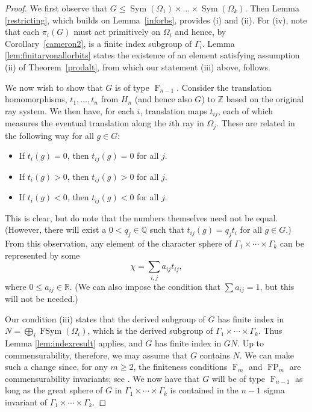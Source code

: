 \documentclass[11pt,a4paper]{amsart}
\theoremstyle{definition}
\theoremstyle{remark}
\newcommand{\Sym}{\operatorname{Sym}}
\newcommand{\FSym}{\operatorname{FSym}}
\newcommand{\Q}{\mathbb Q}
\newcommand{\Z}{\mathbb Z}
\newcommand{\R}{\mathbb R}
\newcommand{\FFF}{\operatorname{F}}
\newcommand{\FP}{\operatorname{FP}}
\begin{document}
\begin{proof}
	We first observe that $G\le \Sym(\Omega_1) \times \ldots\times \Sym(\Omega_k)$. Then Lemma \ref{restricting}, which builds on Lemma~\ref{inforbs}, provides (i) and  (ii).  For (iv), note that each $\pi_i(G)$ must act primitively on $\Omega_i$ and hence, by Corollary~\ref{cameron2}, is a finite index subgroup of $\Gamma_i$. Lemma \ref{lem:finitaryonallorbits} states the existence of an element satisfying assumption (ii) of Theorem~\ref{prodalt}, from which our statement (iii) above, follows.
	 	 
	We now wish to show that $G$ is of type $\FFF_{n-1}$. Consider the translation homomorphisms, $t_1, \ldots, t_n$ from $H_n$ (and hence also $G$) to $\Z$ based on the original ray system. We then have, for each $i$, translation maps $t_{ij}$, each of which measures the eventual translation along the $i$th ray in $\Omega_j$. These are related in the following way for all $g \in G$: 
	
	\begin{itemize}
		\item If $t_i(g)=0$, then $t_{ij}(g) = 0$ for all $j$. 
		\item If $t_i(g) >0$, then $t_{ij}(g) > 0$ for all $j$. 
		\item If $t_i(g) <0$, then $t_{ij}(g) < 0$ for all $j$.  
	\end{itemize}
	 
This is clear, but do note that the numbers themselves need not be equal. (However, there will exist a $0 < q_j \in \Q$ such that $t_{ij}(g) = q_j t_i$ for all $g \in G$.) From this observation, any element of the character sphere of $\Gamma_1 \times \cdots \times\Gamma_k$ can be represented by some 
$$
\chi = \sum_{i,j} a_{ij} t_{ij}, 
$$
where $0 \leq a_{ij} \in \R$. (We can also impose the condition that $\sum a_{ij} = 1$, but this will not be needed.) 


Our condition (iii) states that the derived subgroup of $G$ has finite index in $N=\bigoplus_{i}\FSym(\Omega_i)$, which is the derived subgroup of $\Gamma_1 \times \cdots \times\Gamma_k$. Thus Lemma \ref{lem:indexresult} applies, and $G$ has finite index in $GN$. Up to commensurability, therefore, we may assume that $G$ contains $N$. We can make such a change since, for any $m\ge 2$, the finiteness conditions $\FFF_m$ and $\FP_m$ are commensurability invariants; see \cite[Corollary 9]{Alonso}. We now have that $G$ will be of type $\FFF_{n-1}$ as long as the great sphere of $G$ in $\Gamma_1 \times \cdots \times \Gamma_k$ is contained in the $n-1$ sigma invariant of $\Gamma_1 \times \cdots \times \Gamma_k$. 



\end{proof}
\end{document}
